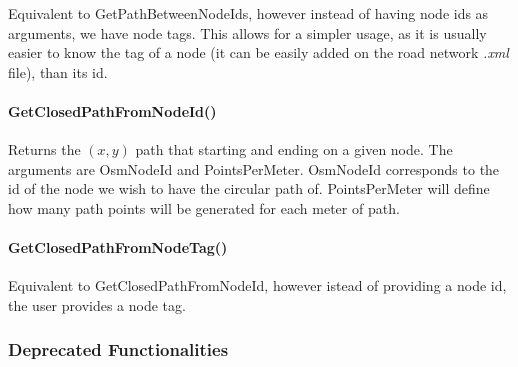 Equivalent to GetPathBetweenNodeIds, however instead of having node ids as arguments, we have node tags. This allows for a simpler usage, as it is usually easier to know the tag of a node (it can be easily added on the road network \textit{.xml} file), than its id.

\paragraph{GetClosedPathFromNodeId()}

Returns the $(x,y)$ path that starting and ending on a given node. The arguments are OsmNodeId and PointsPerMeter. OsmNodeId corresponds to the id of the node we wish to have the circular path of. PointsPerMeter will define how many path points will be generated for each meter of path.

\paragraph{GetClosedPathFromNodeTag()}

Equivalent to GetClosedPathFromNodeId, however istead of providing a node id, the user provides a node tag.

\subsubsection{Deprecated Functionalities}

